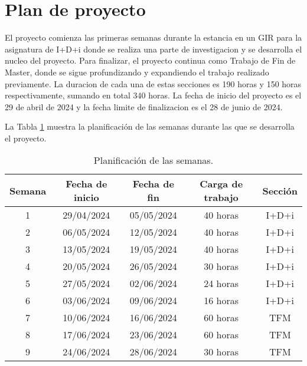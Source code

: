 \section{Plan de proyecto}

El proyecto comienza las primeras semanas durante la estancia en un GIR para la asignatura de I+D+i donde se realiza una parte de investigacion y se desarrolla el nucleo del proyecto. Para finalizar, el proyecto continua como Trabajo de Fin de Master, donde se sigue profundizando y expandiendo el trabajo realizado previamente. La duracion de cada una de estas secciones es 190 horas y 150 horas respectivamente, sumando en total 340 horas. La fecha de inicio del proyecto es el 29 de abril de 2024 y la fecha limite de finalizacion es el 28 de junio de 2024.


La Tabla \ref{table:planificacion} muestra la planificación de las semanas durante las que se desarrolla el proyecto.

\begin{table}[]
    \centering
    \begin{tabular}{|c|c|c|c|c|}
        \hline
        { \textbf{Semana}} & { \textbf{Fecha de inicio}} & { \textbf{Fecha de fin}} & { \textbf{Carga de trabajo}} & { \textbf{Sección}} \\ \hline
        1                  & 29/04/2024                  & 05/05/2024               & 40 horas                     & I+D+i               \\ \hline
        2                  & 06/05/2024                  & 12/05/2024               & 40 horas                     & I+D+i               \\ \hline
        3                  & 13/05/2024                  & 19/05/2024               & 40 horas                     & I+D+i               \\ \hline
        4                  & 20/05/2024                  & 26/05/2024               & 30 horas                     & I+D+i               \\ \hline
        5                  & 27/05/2024                  & 02/06/2024               & 24 horas                     & I+D+i               \\ \hline
        6                  & 03/06/2024                  & 09/06/2024               & 16 horas                     & I+D+i               \\ \hline
        7                  & 10/06/2024                  & 16/06/2024               & 60 horas                     & TFM                 \\ \hline
        8                  & 17/06/2024                  & 23/06/2024               & 60 horas                     & TFM                 \\ \hline
        9                  & 24/06/2024                  & 28/06/2024               & 30 horas                     & TFM                 \\ \hline
    \end{tabular}
    \caption{Planificación de las semanas.}
    \label{table:planificacion}
\end{table}

